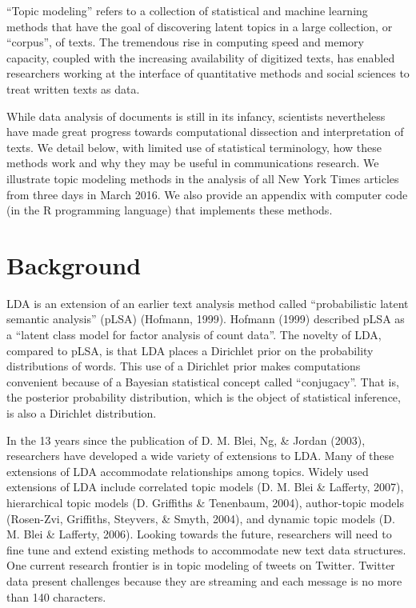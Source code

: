\documentclass[12pt,]{article}
\begin{document}
``Topic modeling'' refers to a collection of statistical and machine
learning methods that have the goal of discovering latent topics in a
large collection, or ``corpus'', of texts. The tremendous rise in
computing speed and memory capacity, coupled with the increasing
availability of digitized texts, has enabled researchers working at the
interface of quantitative methods and social sciences to treat written
texts as data.

While data analysis of documents is still in its infancy, scientists
nevertheless have made great progress towards computational dissection
and interpretation of texts. We detail below, with limited use of
statistical terminology, how these methods work and why they may be
useful in communications research. We illustrate topic modeling methods
in the analysis of all New York Times articles from three days in March
2016. We also provide an appendix with computer code (in the R
programming language) that implements these methods.

\section{Background}\label{background}

LDA is an extension of an earlier text analysis method called
``probabilistic latent semantic analysis'' (pLSA) (Hofmann, 1999).
Hofmann (1999) described pLSA as a ``latent class model for factor
analysis of count data''. The novelty of LDA, compared to pLSA, is that
LDA places a Dirichlet prior on the probability distributions of words.
This use of a Dirichlet prior makes computations convenient because of a
Bayesian statistical concept called ``conjugacy''. That is, the
posterior probability distribution, which is the object of statistical
inference, is also a Dirichlet distribution.

In the 13 years since the publication of D. M. Blei, Ng, \& Jordan
(2003), researchers have developed a wide variety of extensions to LDA.
Many of these extensions of LDA accommodate relationships among topics.
Widely used extensions of LDA include correlated topic models (D. M.
Blei \& Lafferty, 2007), hierarchical topic models (D. Griffiths \&
Tenenbaum, 2004), author-topic models (Rosen-Zvi, Griffiths, Steyvers,
\& Smyth, 2004), and dynamic topic models (D. M. Blei \& Lafferty,
2006). Looking towards the future, researchers will need to fine tune
and extend existing methods to accommodate new text data structures. One
current research frontier is in topic modeling of tweets on Twitter.
Twitter data present challenges because they are streaming and each
message is no more than 140 characters.
\end{document}
